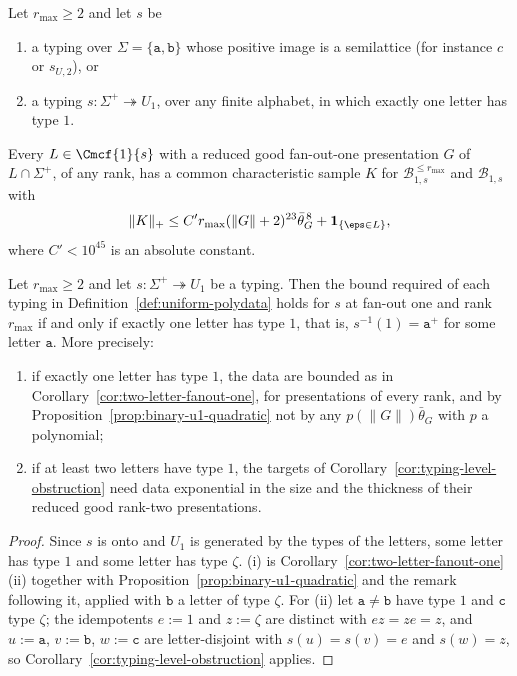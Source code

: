 \begin{corollary}
\label{cor:two-letter-fanout-one}
Let $r_{\max}\ge2$ and let $s$ be
\begin{enumerate}[label=\textup{(\roman*)},leftmargin=*]
\item a typing over $\Sigma=\{\mathtt a,\mathtt b\}$ whose positive image is a
semilattice \textup(for instance $c$ or $s_{U,2}$\textup), or
\item a typing $s:\Sigma^+\twoheadrightarrow U_1$, over any finite alphabet,
in which exactly one letter has type $1$.
\end{enumerate}
Every $L\in\Cmcf{1}{s}$ with a reduced good fan-out-one presentation $G$ of
$L\cap\Sigma^+$, of any rank, has a common characteristic sample $K$ for
$\mathcal B^{\le r_{\max}}_{1,s}$ and $\mathcal B_{1,s}$ with
\[
 \|K\|_+\le C'r_{\max}(\|G\|+2)^{23}\bar\theta_G^{\,8}+\mathbf 1_{\{\eps\in L\}},
\]
where $C'<10^{45}$ is an absolute constant.
\end{corollary}

\begin{corollary}
\label{cor:u1-classification}
Let $r_{\max}\ge2$ and let $s:\Sigma^+\twoheadrightarrow U_1$ be a typing.  Then
the bound required of each typing in Definition~\ref{def:uniform-polydata}
holds for $s$ at fan-out one and rank $r_{\max}$ if and only if exactly one
letter has type $1$, that is, $s^{-1}(1)=\mathtt a^+$ for some letter $\mathtt a$.  More precisely:
\begin{enumerate}[label=\textup{(\roman*)},leftmargin=*]
\item if exactly one letter has type $1$, the data are bounded as in
Corollary~\ref{cor:two-letter-fanout-one}, for presentations of every rank, and
by Proposition~\ref{prop:binary-u1-quadratic} not by any $p(\|G\|)\bar\theta_G$
with $p$ a polynomial;
\item if at least two letters have type $1$, the targets of
Corollary~\ref{cor:typing-level-obstruction} need data exponential in the size
and the thickness of their reduced good rank-two presentations.
\end{enumerate}
\end{corollary}

\begin{proof}
Since $s$ is onto and $U_1$ is generated by the types of the letters, some letter
has type $1$ and some letter has type $\zeta$.  (i) is
Corollary~\ref{cor:two-letter-fanout-one}(ii) together with
Proposition~\ref{prop:binary-u1-quadratic} and the remark following it, applied
with $\mathtt b$ a letter of type $\zeta$.  For (ii) let $\mathtt a\ne\mathtt b$ have
type $1$ and $\mathtt c$ type $\zeta$; the idempotents $e:=1$ and $z:=\zeta$ are
distinct with $ez=ze=z$, and $u:=\mathtt a$, $v:=\mathtt b$, $w:=\mathtt c$ are
letter-disjoint with $s(u)=s(v)=e$ and $s(w)=z$, so
Corollary~\ref{cor:typing-level-obstruction} applies.
\end{proof}

